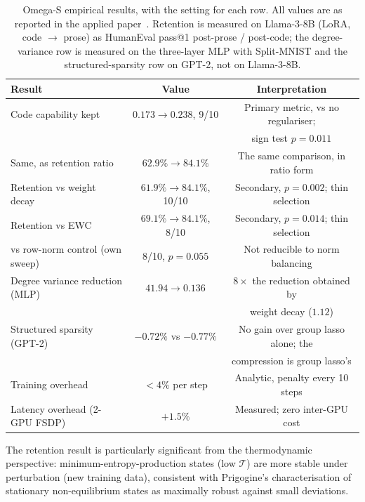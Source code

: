 \documentclass[11pt,a4paper]{article}
\begin{document}
\begin{table}[ht]
\centering
\caption{Omega-S empirical results, with the setting for each row. All
values are as reported in the applied paper~\cite{acedo2026omegas}.
Retention is measured on Llama-3-8B (LoRA, code $\to$ prose) as
HumanEval pass@1 post-prose / post-code; the degree-variance row is measured
on the three-layer MLP with Split-MNIST and the structured-sparsity row on
GPT-2, not on Llama-3-8B.}
\label{tab:omega_results}
\small\setlength{\tabcolsep}{4pt}
\begin{tabular}{lcc}
\toprule
Result & Value & Interpretation \\
\midrule
Code capability kept & $0.173 \to 0.238$, 9/10 &
  Primary metric, vs no regulariser; \\
 & & sign test $p=0.011$ \\
Same, as retention ratio & $62.9\% \to 84.1\%$ &
  The same comparison, in ratio form \\
Retention vs weight decay & $61.9\% \to 84.1\%$, 10/10 &
  Secondary, $p=0.002$; thin selection \\
Retention vs EWC & $69.1\% \to 84.1\%$, 8/10 &
  Secondary, $p=0.014$; thin selection \\
vs row-norm control (own sweep) & 8/10, $p=0.055$ &
  Not reducible to norm balancing \\
Degree variance reduction (MLP) & $41.94 \to 0.136$ &
  $8\times$ the reduction obtained by \\
 & & weight decay ($1.12$) \\
Structured sparsity (GPT-2) & $-0.72\%$ vs $-0.77\%$ &
  No gain over group lasso alone; the \\
 & & compression is group lasso's \\
Training overhead & $<4\%$ per step &
  Analytic, penalty every 10 steps \\
Latency overhead (2-GPU FSDP) & $+1.5\%$ &
  Measured; zero inter-GPU cost \\
\bottomrule
\end{tabular}
\end{table}

The retention result is particularly significant from the thermodynamic
perspective: minimum-entropy-production states (low $\mathcal{T}$) are
more stable under perturbation (new training data), consistent with
Prigogine's characterisation of stationary non-equilibrium states as
maximally robust against small deviations.

\end{document}
